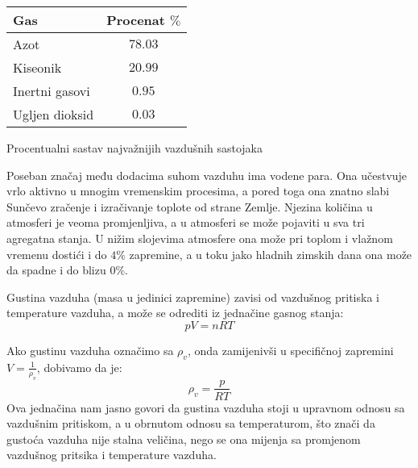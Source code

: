 	\begin{margintable}[0pt]
		\footnotesize%
		\begin{center}
			\begin{tabular}{lc}
				\toprule
				Gas & Procenat $ \% $ \\
				\midrule
				Azot     & $78.03$  \\
				Kiseonik      & $20.99$  \\
				Inertni gasovi     & $0.95$  \\
				Ugljen dioksid    & $0.03$  \\
			
				\bottomrule
			\end{tabular}
		\end{center}
		\caption{Procentualni sastav najvažnijih vazdušnih sastojaka}
		\label{tab:sastav-atm}
	\end{margintable}


Poseban značaj među dodacima suhom vazduhu ima vodene para. Ona učestvuje vrlo aktivno u mnogim vremenskim procesima, a pored toga ona znatno slabi Sunčevo zračenje i izračivanje toplote od strane Zemlje. Njezina količina u atmosferi je veoma promjenljiva, a u atmosferi se može pojaviti u sva tri agregatna stanja. U nižim slojevima atmosfere ona može pri toplom i vlažnom vremenu dostići i do $4\%$ zapremine, a u toku jako hladnih zimskih dana ona može da spadne i do blizu $0\%$.

Gustina vazduha (masa u jedinici zapremine) zavisi od vazdušnog pritiska i temperature vazduha, a može se odrediti iz jednačine gasnog stanja: 
$$ pV = nRT $$

Ako gustinu vazduha označimo sa $ \rho_v $, onda zamijenivši u specifičnoj zapremini $ V = \frac{1}{\rho_v}
$, dobivamo da je: 
$$ \rho_v = \frac{p}{RT} $$
Ova jednačina nam jasno govori da gustina vazduha stoji u upravnom odnosu sa vazdušnim pritiskom, a u obrnutom odnosu sa temperaturom, što znači da gustoća vazduha nije stalna veličina, nego se ona mijenja sa promjenom vazdušnog pritsika i temperature vazduha.\\

